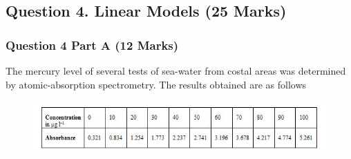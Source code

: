 \documentclass[a4paper,12pt]{article}
\begin{document}
\newpage
\subsection*{Question 4. Linear Models (25 Marks)}
\subsubsection*{Question 4 Part A (12 Marks)}
The mercury level of several tests of sea-water from costal areas was determined by atomic-absorption spectrometry. The results obtained are as follows

\begin{figure}[h!]
	\centering
	\includegraphics[width=1.1\linewidth]{image/regressionData}
\end{figure}
\end{document}
